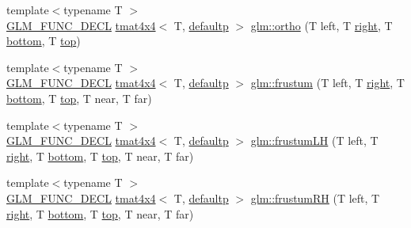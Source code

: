 \begin{DoxyCompactItemize}
\item 
{\footnotesize template$<$typename T $>$ }\\\mbox{\hyperlink{setup_8hpp_ab2d052de21a70539923e9bcbf6e83a51}{G\+L\+M\+\_\+\+F\+U\+N\+C\+\_\+\+D\+E\+CL}} \mbox{\hyperlink{structglm_1_1tmat4x4}{tmat4x4}}$<$ T, \mbox{\hyperlink{namespaceglm_a0f04f086094c747d227af4425893f545a9d21ccd8b5a009ec7eb7677befc3bf51}{defaultp}} $>$ \mbox{\hyperlink{group__gtc__matrix__transform_ga45b1b64f99255c07119b4f1aaed04dd7}{glm\+::ortho}} (T left, T \mbox{\hyperlink{glad_8h_ab412e67df941b4600c352b0b9e76d2ee}{right}}, T \mbox{\hyperlink{glad_8h_a8f1e84df0c183c8fd701618316c9e280}{bottom}}, T \mbox{\hyperlink{glad_8h_ae78295170773f8782029afc65913897a}{top}})
\item 
{\footnotesize template$<$typename T $>$ }\\\mbox{\hyperlink{setup_8hpp_ab2d052de21a70539923e9bcbf6e83a51}{G\+L\+M\+\_\+\+F\+U\+N\+C\+\_\+\+D\+E\+CL}} \mbox{\hyperlink{structglm_1_1tmat4x4}{tmat4x4}}$<$ T, \mbox{\hyperlink{namespaceglm_a0f04f086094c747d227af4425893f545a9d21ccd8b5a009ec7eb7677befc3bf51}{defaultp}} $>$ \mbox{\hyperlink{group__gtc__matrix__transform_gada6deb989d4b553fe0f7e3279f3afae1}{glm\+::frustum}} (T left, T \mbox{\hyperlink{glad_8h_ab412e67df941b4600c352b0b9e76d2ee}{right}}, T \mbox{\hyperlink{glad_8h_a8f1e84df0c183c8fd701618316c9e280}{bottom}}, T \mbox{\hyperlink{glad_8h_ae78295170773f8782029afc65913897a}{top}}, T near, T far)
\item 
{\footnotesize template$<$typename T $>$ }\\\mbox{\hyperlink{setup_8hpp_ab2d052de21a70539923e9bcbf6e83a51}{G\+L\+M\+\_\+\+F\+U\+N\+C\+\_\+\+D\+E\+CL}} \mbox{\hyperlink{structglm_1_1tmat4x4}{tmat4x4}}$<$ T, \mbox{\hyperlink{namespaceglm_a0f04f086094c747d227af4425893f545a9d21ccd8b5a009ec7eb7677befc3bf51}{defaultp}} $>$ \mbox{\hyperlink{group__gtc__matrix__transform_ga75b1c1d0ee1f80c1e873605adeb1838c}{glm\+::frustum\+LH}} (T left, T \mbox{\hyperlink{glad_8h_ab412e67df941b4600c352b0b9e76d2ee}{right}}, T \mbox{\hyperlink{glad_8h_a8f1e84df0c183c8fd701618316c9e280}{bottom}}, T \mbox{\hyperlink{glad_8h_ae78295170773f8782029afc65913897a}{top}}, T near, T far)
\item 
{\footnotesize template$<$typename T $>$ }\\\mbox{\hyperlink{setup_8hpp_ab2d052de21a70539923e9bcbf6e83a51}{G\+L\+M\+\_\+\+F\+U\+N\+C\+\_\+\+D\+E\+CL}} \mbox{\hyperlink{structglm_1_1tmat4x4}{tmat4x4}}$<$ T, \mbox{\hyperlink{namespaceglm_a0f04f086094c747d227af4425893f545a9d21ccd8b5a009ec7eb7677befc3bf51}{defaultp}} $>$ \mbox{\hyperlink{group__gtc__matrix__transform_gad0e184273bdacbe769e5cd81069e48ed}{glm\+::frustum\+RH}} (T left, T \mbox{\hyperlink{glad_8h_ab412e67df941b4600c352b0b9e76d2ee}{right}}, T \mbox{\hyperlink{glad_8h_a8f1e84df0c183c8fd701618316c9e280}{bottom}}, T \mbox{\hyperlink{glad_8h_ae78295170773f8782029afc65913897a}{top}}, T near, T far)

\end{DoxyCompactItemize}
